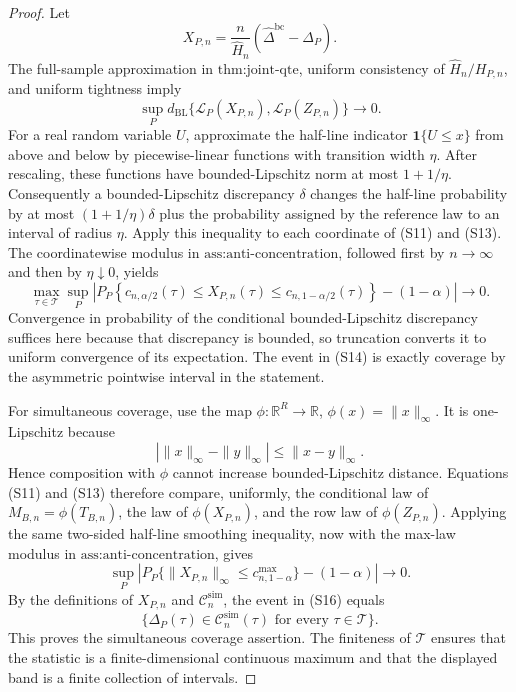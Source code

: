 \documentclass{article}
\begin{document}
\begin{proof}
Let
\[
X_{P,n}=\frac n{\widehat H_n}(\widehat\Delta^{\mathrm{bc}}-\Delta_P).
\tag{S12}
\]
The full-sample approximation in \(\text{thm:joint-qte}\), uniform consistency of \(\widehat H_n/H_{P,n}\), and uniform tightness imply
\[
\sup_Pd_{\mathrm{BL}}\{\mathcal L_P(X_{P,n}),\mathcal L_P(Z_{P,n})\}\to0.
\tag{S13}
\]
For a real random variable \(U\), approximate the half-line indicator \(\mathbf1\{U\le x\}\) from above and below by piecewise-linear functions with transition width \(\eta\). After rescaling, these functions have bounded-Lipschitz norm at most \(1+1/\eta\). Consequently a bounded-Lipschitz discrepancy \(\delta\) changes the half-line probability by at most \((1+1/\eta)\delta\) plus the probability assigned by the reference law to an interval of radius \(\eta\). Apply this inequality to each coordinate of (S11) and (S13). The coordinatewise modulus in \(\text{ass:anti-concentration}\), followed first by \(n\to\infty\) and then by \(\eta\downarrow0\), yields
\[
\max_{\tau\in\mathcal T}\sup_P\left|
P_P\!\left\{
c_{n,\alpha/2}(\tau)\le X_{P,n}(\tau)
\le c_{n,1-\alpha/2}(\tau)\right\}-(1-\alpha)
\right|\to0.
\tag{S14}
\]
Convergence in probability of the conditional bounded-Lipschitz discrepancy suffices here because that discrepancy is bounded, so truncation converts it to uniform convergence of its expectation. The event in (S14) is exactly coverage by the asymmetric pointwise interval in the statement.

For simultaneous coverage, use the map \(\phi:\mathbb R^R\to\mathbb R\), \(\phi(x)=\|x\|_\infty\). It is one-Lipschitz because
\[
|\|x\|_\infty-\|y\|_\infty|\le\|x-y\|_\infty.
\tag{S15}
\]
Hence composition with \(\phi\) cannot increase bounded-Lipschitz distance. Equations (S11) and (S13) therefore compare, uniformly, the conditional law of
\(M_{B,n}=\phi(T_{B,n})\), the law of \(\phi(X_{P,n})\), and the row law of \(\phi(Z_{P,n})\). Applying the same two-sided half-line smoothing inequality, now with the max-law modulus in \(\text{ass:anti-concentration}\), gives
\[
\sup_P\left|
P_P\{\|X_{P,n}\|_\infty\le c^{\max}_{n,1-\alpha}\}-(1-\alpha)
\right|\to0.
\tag{S16}
\]
By the definitions of \(X_{P,n}\) and \(\mathcal C_n^{\mathrm{sim}}\), the event in (S16) equals
\[
\{\Delta_P(\tau)\in\mathcal C_n^{\mathrm{sim}}(\tau)
\text{ for every }\tau\in\mathcal T\}.
\tag{S17}
\]
This proves the simultaneous coverage assertion. The finiteness of \(\mathcal T\) ensures that the statistic is a finite-dimensional continuous maximum and that the displayed band is a finite collection of intervals.


\end{proof}
\end{document}
